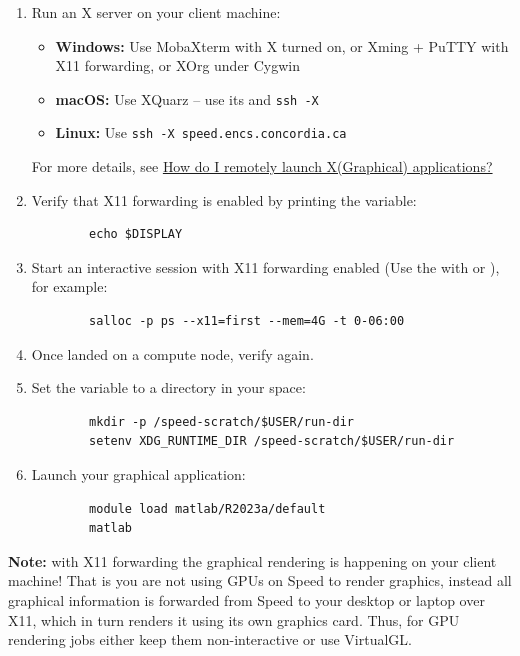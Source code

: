\begin{enumerate}
	\item Run an X server on your client machine:
	\begin{itemize}
		\item \textbf{Windows:} Use MobaXterm with X turned on, or Xming + PuTTY with X11 forwarding, or XOrg under Cygwin
		\item \textbf{macOS:} Use XQuarz -- use its  and \texttt{ssh -X}
		\item \textbf{Linux:} Use \texttt{ssh -X speed.encs.concordia.ca}
	\end{itemize}
	For more details, see \href{https://www.concordia.ca/ginacody/aits/support/faq/xserver.html}{How do I remotely launch X(Graphical) applications?}

	\item Verify that X11 forwarding is enabled by printing the  variable:
	\begin{verbatim}
		echo $DISPLAY
	\end{verbatim}

	\item Start an interactive session with X11 forwarding enabled (Use the  with  or ), for example:
	\begin{verbatim}
		salloc -p ps --x11=first --mem=4G -t 0-06:00
	\end{verbatim}

	\item Once landed on a compute node, verify  again.
	
	\item Set the  variable to a directory in your  space:
	\begin{verbatim}
		mkdir -p /speed-scratch/$USER/run-dir
		setenv XDG_RUNTIME_DIR /speed-scratch/$USER/run-dir
	\end{verbatim}
	
	\item Launch your graphical application:
	\begin{verbatim}
		module load matlab/R2023a/default 
		matlab
	\end{verbatim}
\end{enumerate}

\noindent
\textbf{Note:} with X11 forwarding the graphical rendering is happening on
your client machine! That is you are not using GPUs on Speed to render
graphics, instead all graphical information is forwarded from Speed to
your desktop or laptop over X11, which in turn renders it using its
own graphics card. Thus, for GPU rendering jobs either keep them
non-interactive or use VirtualGL.\\

